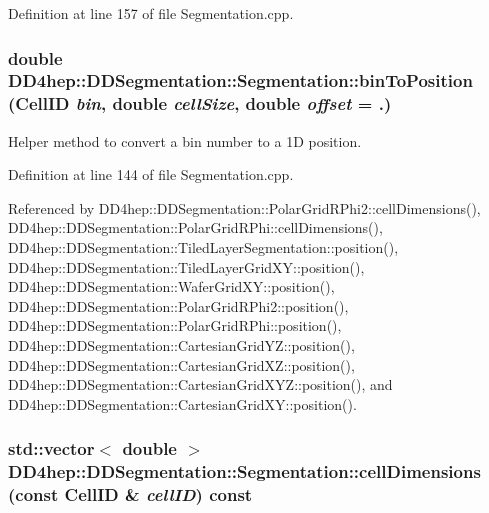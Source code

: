 Definition at line 157 of file Segmentation.cpp.\hypertarget{class_d_d4hep_1_1_d_d_segmentation_1_1_segmentation_a550acc9cdf597965091b4d76ce1578cb}{
\subsubsection[{binToPosition}]{\setlength{\rightskip}{0pt plus 5cm}double DD4hep::DDSegmentation::Segmentation::binToPosition ({\bf CellID} {\em bin}, \/  double {\em cellSize}, \/  double {\em offset} = {.})}}
\label{class_d_d4hep_1_1_d_d_segmentation_1_1_segmentation_a550acc9cdf597965091b4d76ce1578cb}


Helper method to convert a bin number to a 1D position. 

Definition at line 144 of file Segmentation.cpp.

Referenced by DD4hep::DDSegmentation::PolarGridRPhi2::cellDimensions(), DD4hep::DDSegmentation::PolarGridRPhi::cellDimensions(), DD4hep::DDSegmentation::TiledLayerSegmentation::position(), DD4hep::DDSegmentation::TiledLayerGridXY::position(), DD4hep::DDSegmentation::WaferGridXY::position(), DD4hep::DDSegmentation::PolarGridRPhi2::position(), DD4hep::DDSegmentation::PolarGridRPhi::position(), DD4hep::DDSegmentation::CartesianGridYZ::position(), DD4hep::DDSegmentation::CartesianGridXZ::position(), DD4hep::DDSegmentation::CartesianGridXYZ::position(), and DD4hep::DDSegmentation::CartesianGridXY::position().\hypertarget{class_d_d4hep_1_1_d_d_segmentation_1_1_segmentation_a9710f4942d7f6b52ae5342652e17c88d}{
\subsubsection[{cellDimensions}]{\setlength{\rightskip}{0pt plus 5cm}std::vector$<$ double $>$ DD4hep::DDSegmentation::Segmentation::cellDimensions (const {\bf CellID} \& {\em cellID}) const}}
\label{class_d_d4hep_1_1_d_d_segmentation_1_1_segmentation_a9710f4942d7f6b52ae5342652e17c88d}


